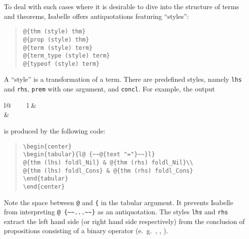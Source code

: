 \begin{isabellebody}
\begin{isamarkuptext}
  To deal with such cases where it is desirable to dive into the structure
  of terms and theorems, Isabelle offers antiquotations featuring
  ``styles'':

    \begin{quote}
    \verb!@!\verb!{thm (style) thm}!\\
    \verb!@!\verb!{prop (style) thm}!\\
    \verb!@!\verb!{term (style) term}!\\
    \verb!@!\verb!{term_type (style) term}!\\
    \verb!@!\verb!{typeof (style) term}!\\
    \end{quote}

  A ``style'' is a transformation of a term. There are predefined
  styles, namely \verb!lhs! and \verb!rhs!, \verb!prem! with one argument, and \verb!concl!.
  For example, 
  the output
  \begin{center}
  \begin{tabular}{l@ {~~\isa{{\isacharequal}}~~}l}
   & \\
   & 
  \end{tabular}
  \end{center}
  is produced by the following code:
  \begin{quote}
    \verb!\begin{center}!\\
    \verb!\begin{tabular}{l@ {~~!\verb!@!\verb!{text "="}~~}l}!\\
    \verb!@!\verb!{thm (lhs) foldl_Nil} & @!\verb!{thm (rhs) foldl_Nil}\\!\\
    \verb!@!\verb!{thm (lhs) foldl_Cons} & @!\verb!{thm (rhs) foldl_Cons}!\\
    \verb!\end{tabular}!\\
    \verb!\end{center}!
  \end{quote}
  Note the space between \verb!@! and \verb!{! in the tabular argument.
  It prevents Isabelle from interpreting \verb!@ {~~...~~}! 
  as an antiquotation. The styles \verb!lhs! and \verb!rhs!
  extract the left hand side (or right hand side respectively) from the
  conclusion of propositions consisting of a binary operator
  (e.~g.~\isa{{\isacharequal}}, \isa{{\isasymequiv}}, \isa{{\isacharless}}).


\end{isamarkuptext}
\end{isabellebody}
